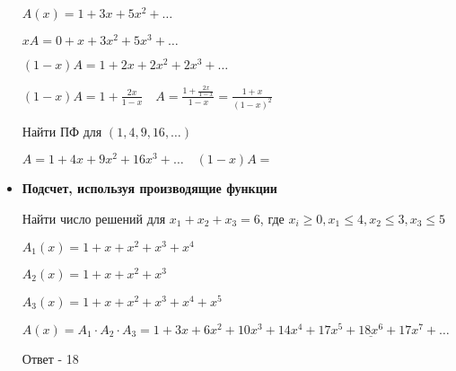\documentclass[12pt]{article}
\begin{document}
\begin{itemize}
        $A(x) = 1 + 3x + 5x^2 + \dots$

        $xA = 0 + x + 3x^2 + 5x^3 + \dots$

        $(1 - x)A = 1 + 2x + 2x^2 + 2x^3 + \dots$

        $(1 - x)A = 1 + \frac{2x}{1 - x} \quad A = \frac{1 + \frac{2x}{1 - x}}{1 - x} = \frac{1 + x}{(1 - x)^2}$

        \Ex Найти ПФ для $(1, 4, 9, 16, \dots)$

        $A = 1 + 4x + 9x^2 + 16x^3 + \dots \quad (1 - x)A = $

        \item \textbf{Подсчет, используя производящие функции}

        Найти число решений для $x_1 + x_2 + x_3 = 6$, где $x_i \geq 0, x_1 \leq 4, x_2 \leq 3, x_3 \leq 5$

        $A_1(x) = 1 + x + x^2 + x^3 + x^4$

        $A_2(x) = 1 + x + x^2 + x^3$

        $A_3(x) = 1 + x + x^2 + x^3 + x^4 + x^5$

        $A(x) = A_1 \cdot A_2 \cdot A_3 = 1 + 3x + 6x^2 + 10x^3 + 14x^4 + 17x^5 + \underline{18x^6} + 17x^7 + \dots$

        Ответ - 18

    \end{itemize}
\end{document}
